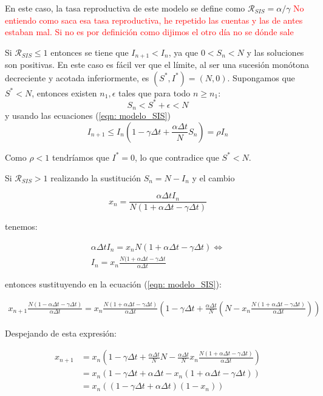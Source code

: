 En este caso, la tasa reproductiva de este modelo se define como $\mathcal{R}_{SIS}=\alpha /\gamma$ \textcolor{red}{No entiendo como saca esa tasa reproductiva, he repetido las cuentas y las de antes estaban mal. Si no es por definición como dijimos el otro día no se dónde sale}

Si $\mathcal{R}_{SIS}\leq 1$ entonces se tiene que $I_{n+1} < I_n$, ya que $0<S_n<N$ y las soluciones son positivas. En este caso es fácil ver que el límite, al ser una sucesión monótona decreciente y acotada inferiormente, es $(S^*,I^*)=(N,0)$. Supongamos que $S^*<N$, entonces existen $n_1, \epsilon$ tales que para todo $n \geq n_1$:
$$S_n<S^*+\epsilon < N$$
y usando las ecuaciones (\ref{eqn: modelo_SIS})
$$I_{n+1} \leq I_n \left( 1-\gamma \Delta t + \frac{\alpha\Delta t}{N} S_n \right) = \rho I_n$$

Como $\rho < 1$ tendríamos que $I^*=0$, lo que contradice que $S^*<N$.

Si $\mathcal{R}_{SIS}>1$ realizando la sustitución $S_n=N-I_n$ y el cambio

$$x_n=\frac{\alpha \Delta t I_n}{N(1+\alpha \Delta t - \gamma \Delta t)}$$

tenemos:

\begin{equation}
\begin{aligned}
\alpha\Delta t I_n = x_nN(1+\alpha\Delta t-\gamma\Delta t) \Leftrightarrow \\
I_n = x_n\frac{N(1+\alpha\Delta t - \gamma\Delta t}{\alpha\Delta t}
\end{aligned}
\end{equation}

entonces sustituyendo en la ecuación (\ref{eqn: modelo_SIS}):

\begin{equation}
\begin{aligned}
x_{n+1}\frac{N(1-\alpha\Delta t-\gamma\Delta t)}{\alpha \Delta t} = x_n\frac{N(1+\alpha\Delta t-\gamma \Delta t)}{\alpha\Delta t}\left( 1-\gamma\Delta t+\frac{\alpha\Delta t}{N}\left(N-x_n\frac{N(1+\alpha\Delta t-\gamma\Delta t)}{\alpha\Delta t}\right) \right)
\end{aligned}
\end{equation}

Despejando de esta expresión:

\begin{equation}
\begin{aligned}
x_{n+1} & = x_n\left( 1-\gamma\Delta t+\frac{\alpha\Delta t}{N}N-\frac{\alpha\Delta t}{N}x_n\frac{N(1+\alpha\Delta t -\gamma \Delta t)}{\alpha\Delta t} \right) \\
& = x_n(1-\gamma\Delta t + \alpha\Delta t -x_n(1+\alpha\Delta t -\gamma\Delta t)) \\
& = x_n((1-\gamma\Delta t+\alpha\Delta t)(1-x_n))
\end{aligned}
\end{equation}

